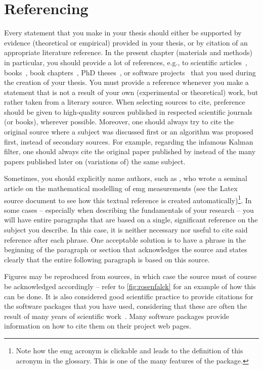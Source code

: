 \section{Referencing}
\label{sec:citation}
Every statement that you make in your thesis should either be supported by evidence (theoretical or empirical) provided in your thesis, or by citation of an appropriate literature reference.
In the present chapter (materials and methods) in particular, you should provide a lot of references, e.g., to scientific articles~\cite{farina99}, books~\cite{plonsey07}, book chapters~\cite{rodriguez-falces12}, PhD theses~\cite{fevotte03}, or software projects~\cite{r-project} that you used during the creation of your thesis.
You must provide a reference whenever you make a statement that is not a result of your own (experimental or theoretical) work, but rather taken from a literary source.
When selecting sources to cite, preference should be given to high-quality sources published in respected scientific journals (or books), wherever possible.
Moreover, one should always try to cite the original source where a subject was discussed first or an algorithm was proposed first, instead of secondary sources.
For example, regarding the infamous Kalman filter, one should always cite the original paper published by \textcite{Kalman1960} instead of the many papers published later on (variations of) the same subject.

Sometimes, you should explicitly name authors, such as \textcite{farina99}, who wrote a seminal article on the mathematical modelling of \gls{emg} measurements (see the Latex source document to see how this textual reference is created automatically)\footnote{Note how the \gls{emg} acronym is clickable and leads to the definition of this acronym in the glossary.
This is one of the many features of the  package.}.
In some cases -- especially when describing the fundamentals of your research -- you will have entire paragraphs that are based on a single, significant reference on the subject you describe.
In this case, it is neither necessary nor useful to cite said reference after each phrase.
One acceptable solution is to have a phrase in the beginning of the paragraph or section that acknowledges the source and states clearly that the entire following paragraph is based on this source.

Figures may be reproduced from sources, in which case the source must of course be acknowledged accordingly -- refer to \cref{fig:rosenfalck} for an example of how this can be done.
It is also considered good scientific practice to provide citations for the software packages that you have used, considering that these are often the result of many years of scientific work~\cite{r-project, Wickham2009}.
Many software packages provide information on how to cite them on their project web pages.


